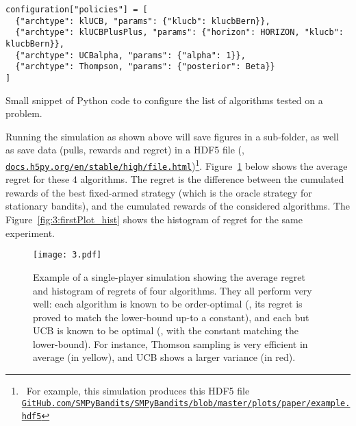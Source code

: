 \begin{small}
\begin{listing}[h!]
    \begin{verbatim}
configuration["policies"] = [
  {"archtype": klUCB, "params": {"klucb": klucbBern}},
  {"archtype": klUCBPlusPlus, "params": {"horizon": HORIZON, "klucb": klucbBern}},
  {"archtype": UCBalpha, "params": {"alpha": 1}},
  {"archtype": Thompson, "params": {"posterior": Beta}}
]
    \end{verbatim}
    \caption{Small snippet of Python code to configure the list of algorithms tested on a problem.}
    \label{lst:3:howToConfigureAlgorithms}
\end{listing}
\end{small}

Running the simulation as shown above will save figures in a sub-folder, as well as save data (pulls, rewards and regret) in a HDF5 file (\cite{h5py}, \texttt{\href{http://docs.h5py.org/en/stable/high/file.html}{docs.h5py.org/en/stable/high/file.html}})\footnote{~For example, this simulation produces this HDF5 file\\\texttt{\href{https://github.com/SMPyBandits/SMPyBandits/blob/master/plots/paper/example.hdf5}{GitHub.com/SMPyBandits/SMPyBandits/blob/master/plots/paper/example.hdf5}}}.
Figure~\ref{fig:3:firstPlot} below shows the average regret for these $4$ algorithms.
The regret is the difference between the cumulated rewards of the best fixed-armed strategy (which is the oracle strategy for stationary bandits), and the cumulated rewards of the considered algorithms.
The Figure~\ref{fig:3:firstPlot_hist} shows the histogram of regret for the same experiment.

\begin{figure}[h!]  %
	\centering
	\texttt{[image: 3.pdf]}
	\caption[Example of a single-player simulation showing the average regret and histogram of regrets of $4$ algorithms]{
		Example of a single-player simulation showing the average regret and histogram of regrets of four algorithms. They all perform very well: each algorithm is known to be order-optimal (\ie, its regret is proved to match the lower-bound up-to a constant), and each but UCB is known to be optimal (\ie, with the constant matching the lower-bound). For instance, Thomson sampling is very efficient in average (in yellow), and UCB shows a larger variance (in red).
	}
	\label{fig:3:firstPlot}
\end{figure}

